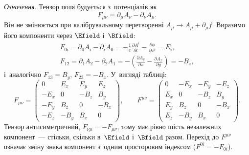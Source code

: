 \begin{Extra}
\emph{Означення.} Тензор поля будується з~потенціалів як
\begin{equation}\label{eq:FieldTensorDef}
	F_{\mu\nu} = \partial_\mu A_\nu - \partial_\nu A_\mu .
\end{equation}
Він не змінюється при калібрувальному перетворенні $A_\mu \to A_\mu + \partial_\mu f$.
Виразимо його компоненти через $\Efield$ і~$\Bfield$:
\begin{equation*}
	\begin{gathered}
		F_{0i} = \partial_0 A_i - \partial_i A_0 = -\frac1c\frac{\partial A^i}{\partial t} -
		\frac{\partial\phi}{\partial x^i} = E_i, \\
		F_{12} = \partial_1 A_2 - \partial_2 A_1 =
		-\left(\frac{\partial A_y}{\partial x} - \frac{\partial A_x}{\partial y}\right) =
		-B_z,
	\end{gathered}
\end{equation*}
і~аналогічно $F_{13} = B_y$, $F_{23} = -B_x$. У~вигляді таблиці:
\begin{equation}\label{eq:FieldTensorMatrix}
	F_{\mu\nu} =
		\begin{pmatrix}
			0    & E_x  & E_y  & E_z  \\
			-E_x & 0    & -B_z & B_y  \\
			-E_y & B_z  & 0    & -B_x \\
			-E_z & -B_y & B_x  & 0
		\end{pmatrix},
		\qquad F^{\mu\nu} =
		\begin{pmatrix}
			0   & -E_x & -E_y & -E_z \\
			E_x & 0    & -B_z & B_y  \\
			E_y & B_z  & 0    & -B_x \\
			E_z & -B_y & B_x  & 0
		\end{pmatrix}.
\end{equation}
Тензор антисиметричний, $F_{\nu\mu} = -F_{\mu\nu}$, тому має рівно шість незалежних
компонент~--- стільки, скільки в~$\Efield$ і~$\Bfield$ разом. Перехід до $F^{\mu\nu}$
означає зміну знака компонент з~одним просторовим індексом ($F^{0i} = -F_{0i}$).


\end{Extra}

